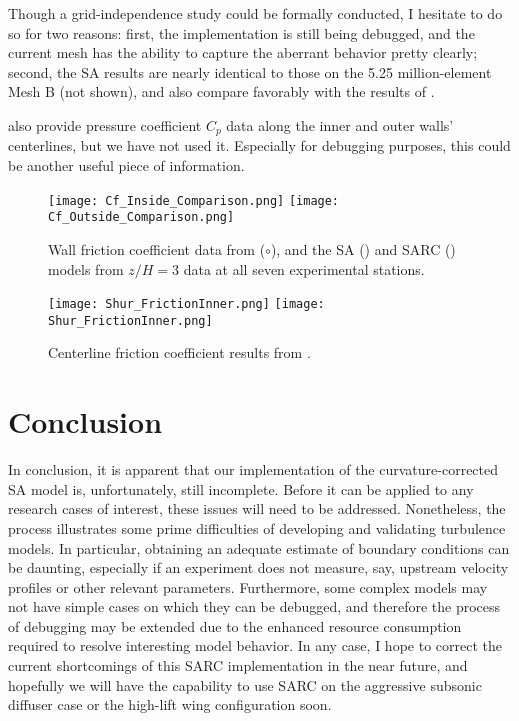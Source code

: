 \documentclass[11pt]{article}
\begin{document}
Though a grid-independence study could be formally conducted, I hesitate to do so for two reasons: first, the implementation is still being debugged, and the current mesh has the ability to capture the aberrant behavior pretty clearly; second, the SA results are nearly identical to those on the 5.25 million-element Mesh B (not shown), and also compare favorably with the results of \citet{shur2000}.

\citet{kim1994} also provide pressure coefficient $C_p$ data along the inner and outer walls' centerlines, but we have not used it. Especially for debugging purposes, this could be another useful piece of information.

\begin{figure}[h!]
\centering
\texttt{[image: Cf\_Inside\_Comparison.png]}
\texttt{[image: Cf\_Outside\_Comparison.png]}
\caption{Wall friction coefficient data from \citet{kim1994} ($\circ$), and the SA ({\color{blue}\solidrule[6mm]}) and SARC ({\color{red}\dashrule}) models from $z/H=3$ data at all seven experimental stations.}
\label{fig:Cf_Centerlines}
\end{figure}

\begin{figure}[h!]
\centering
\texttt{[image: Shur\_FrictionInner.png]}
\texttt{[image: Shur\_FrictionInner.png]}
\caption{Centerline friction coefficient results from \citet{shur2000}.}
\label{fig:Shur_Results}
\end{figure}

\section{Conclusion}

In conclusion, it is apparent that our implementation of the curvature-corrected SA model is, unfortunately, still incomplete. Before it can be applied to any research cases of interest, these issues will need to be addressed. Nonetheless, the process illustrates some prime difficulties of developing and validating turbulence models. In particular, obtaining an adequate estimate of boundary conditions can be daunting, especially if an experiment does not measure, say, upstream velocity profiles or other relevant parameters. Furthermore, some complex models may not have simple cases on which they can be debugged, and therefore the process of debugging may be extended due to the enhanced resource consumption required to resolve interesting model behavior. In any case, I hope to correct the current shortcomings of this SARC implementation in the near future, and hopefully we will have the capability to use SARC on the aggressive subsonic diffuser case or the high-lift wing configuration soon.





\end{document}

